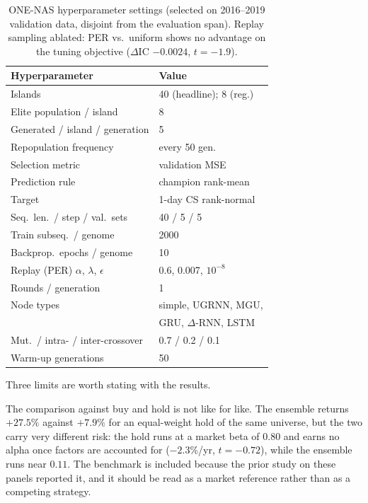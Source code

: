 \begin{table}[t]
\centering
\footnotesize
\begin{tabular}{@{}l@{\hspace{4pt}}l@{}}
\toprule
Hyperparameter & Value \\
\midrule
Islands & 40 (headline); 8 (reg.) \\
Elite population / island & 8 \\
Generated / island / generation & 5 \\
Repopulation frequency & every 50 gen. \\
Selection metric & validation MSE \\
Prediction rule & champion rank-mean \\
Target & 1-day CS rank-normal \\
Seq.\ len.\ / step / val.\ sets & 40 / 5 / 5 \\
Train subseq.\ / genome & 2000 \\
Backprop.\ epochs / genome & 10 \\
Replay (PER) $\alpha$, $\lambda$, $\epsilon$ & 0.6, 0.007, $10^{-8}$ \\
Rounds / generation & 1 \\
Node types & simple, UGRNN, MGU, \\
 & GRU, $\Delta$-RNN, LSTM \\
Mut.\ / intra- / inter-crossover & 0.7 / 0.2 / 0.1 \\
Warm-up generations & 50 \\
\bottomrule
\end{tabular}
\caption{ONE-NAS hyperparameter settings (selected on 2016--2019
validation data, disjoint from the evaluation span). Replay sampling
ablated: PER vs.\ uniform shows no advantage on the tuning objective
($\Delta$IC $-0.0024$, $t{=}-1.9$).}
\label{tab:hps}
\end{table}

Three limits are worth stating with the results.

The comparison against buy and hold is not like for like. The ensemble
returns $+27.5\%$ against $+7.9\%$ for an equal-weight hold of the same
universe, but the two carry very different risk: the hold runs at a
market beta of $0.80$ and earns no alpha once factors are accounted for
($-2.3\%$/yr, $t=-0.72$), while the ensemble runs near $0.11$. The
benchmark is included because the prior study on these panels reported
it, and it should be read as a market reference rather than as a
competing strategy.

